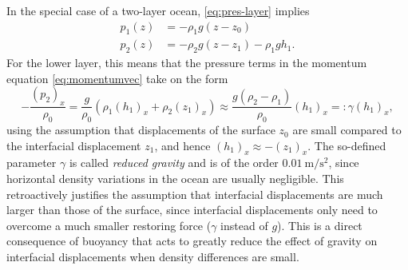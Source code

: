 In the special case of a two-layer ocean, \eqref{eq:pres-layer} implies
%
\begin{align}
p_1(z) &= -\rho_1 g (z-z_0) \\
p_2(z) &= -\rho_2 g (z-z_1) - \rho_1 g h_1.
\end{align}
%
For the lower layer, this means that the pressure terms in the momentum equation \eqref{eq:momentumvec} take on the form
%
\begin{equation}
-\frac{(p_2)_x}{\rho_0} = \frac{g}{\rho_0} (\rho_1 (h_1)_x + \rho_2 (z_1)_x) \approx \frac{g (\rho_2 - \rho_1)}{\rho_0} (h_1)_x =: \gamma (h_1)_x,
\end{equation}
using the assumption that displacements of the surface \(z_0\) are small compared to the interfacial displacement \(z_1\), and hence \((h_1)_x \approx -(z_1)_x\). The so-defined parameter \(\gamma\) is called \emph{reduced gravity} and is of the order \(\SI{0.01}{\metre\per\second\squared}\), since horizontal density variations in the ocean are usually negligible. This retroactively justifies the assumption that interfacial displacements are much larger than those of the surface, since interfacial displacements only need to overcome a much smaller restoring force (\(\gamma\) instead of \(g\)). This is a direct consequence of buoyancy that acts to greatly reduce the effect of gravity on interfacial displacements when density differences are small.

